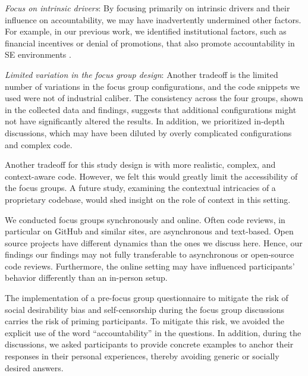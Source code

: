 \textit{Focus on intrinsic drivers}: By focusing primarily on intrinsic drivers and their influence on accountability, we may have inadvertently undermined other factors. For example, in our previous work, we identified institutional factors, such as financial incentives or denial of promotions, that also promote accountability in SE environments \citep{alami2024understanding}. 

\textit{Limited variation in the focus group design}: Another tradeoff is the limited number of variations in the focus group configurations, and the code snippets we used were not of industrial caliber. The consistency across the four groups, shown in the collected data and findings, suggests that additional configurations might not have significantly altered the results. In addition, we prioritized in-depth discussions, which may have been diluted by overly complicated configurations and complex code.

Another tradeoff for this study design is with more realistic, complex, and context-aware code. However, we felt this would greatly limit the accessibility of the focus groups. A future study, examining the contextual intricacies of a proprietary codebase, would shed insight on the role of context in this setting.

We conducted focus groups synchronously and online. Often code reviews, in particular on GitHub and similar sites, are asynchronous and text-based. Open source projects have different dynamics than the ones we discuss here. Hence, our findings our findings may not fully transferable to asynchronous or open-source code reviews. Furthermore, the online setting may have influenced participants' behavior differently than an in-person setup. 

The implementation of a pre-focus group questionnaire to mitigate the risk of social desirability bias \citep{furnham1986response} and self-censorship \citep{yanos2008false} during the focus group discussions carries the risk of priming participants. To mitigate this risk, we avoided the explicit use of the word ``accountability'' in the questions. In addition, during the discussions, we asked participants to provide concrete examples to anchor their responses in their personal experiences, thereby avoiding generic or socially desired answers.


